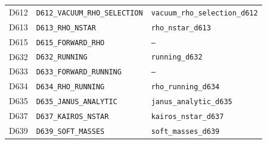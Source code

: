 \documentclass[aps,prd,twocolumn,superscriptaddress,nofootinbib,floatfix]{revtex4-2}
\begin{document}
\begin{table}[tbp]
\begin{ruledtabular}
\begin{tabular}{lll}
D612 & \texttt{D612\_VACUUM\_RHO\_SELECTION} & \texttt{vacuum\_rho\_selection\_d612} \\
D613 & \texttt{D613\_RHO\_NSTAR} & \texttt{rho\_nstar\_d613} \\
D615 & \texttt{D615\_FORWARD\_RHO} & \texttt{---} \\
D632 & \texttt{D632\_RUNNING} & \texttt{running\_d632} \\
D633 & \texttt{D633\_FORWARD\_RUNNING} & \texttt{---} \\
D634 & \texttt{D634\_RHO\_RUNNING} & \texttt{rho\_running\_d634} \\
D635 & \texttt{D635\_JANUS\_ANALYTIC} & \texttt{janus\_analytic\_d635} \\
D637 & \texttt{D637\_KAIROS\_NSTAR} & \texttt{kairos\_nstar\_d637} \\
D639 & \texttt{D639\_SOFT\_MASSES} & \texttt{soft\_masses\_d639} \\
\end{tabular}
\end{ruledtabular}
\end{table}


\end{document}

